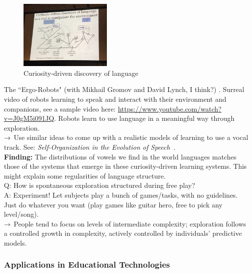 \begin{figure}[h!]
    \centering
    \includegraphics[width=0.4\textwidth]{images/curious.JPG}
    \caption{Curiosity-driven discovery of language}
    \label{fig:curiosity}
\end{figure}

The ``Ergo-Robots" (with Mikhail Gromov and David Lynch, I think?) . Surreal video of robots learning to speak and interact with their environment and companions, see a sample video here: \url{https://www.youtube.com/watch?v=J0gM5i091JQ}. Robots learn to use language in a meaningful way through exploration. \\

$\rightarrow$ Use similar ideas to come up with a realistic models of learning to use a vocal track. See: {\it Self-Organization in the Evolution of Speech}~\cite{oudeyer2006self}. \\

{\bf Finding:} The distributions of vowels we find in the world languages matches those of the systems that emerge in these curiosity-driven learning systems. This might explain some regularities of language structure. \\




Q: How is spontaneous exploration structured during free play? \\

A: Experiment! Let subjects play a bunch of games/tasks, with no guidelines. Just do whatever you want (play games like guitar hero, free to pick any level/song). \\

$\rightarrow$ People tend to focus on levels of intermediate complexity; exploration follows a controlled growth in complexity, actively controlled by individuals' predictive models. 


\subsubsection{Applications in Educational Technologies}


